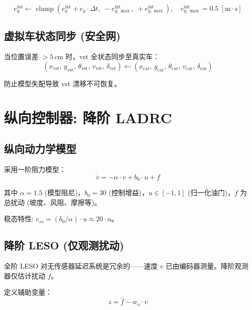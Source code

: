 \documentclass[11pt,a4paper]{article}
\begin{document}
\begin{equation}
e_y^{\text{int}} \leftarrow \operatorname{clamp}\!\left(e_y^{\text{int}} + e_y \cdot \Delta t,\; -e_{y,\max}^{\text{int}},\; +e_{y,\max}^{\text{int}}\right), \quad e_{y,\max}^{\text{int}} = 0.5 \; [\text{m}\!\cdot\!\text{s}]
\end{equation}

\subsection{虚拟车状态同步 (安全网)}

当位置误差 $>5\,\text{cm}$ 时，vst 全状态同步至真实车：
\begin{equation}
(x_{\text{vst}},\, y_{\text{vst}},\, \theta_{\text{vst}},\, v_{\text{vst}},\, \delta_{\text{vst}}) \leftarrow (x_{\text{car}},\, y_{\text{car}},\, \theta_{\text{car}},\, v_{\text{car}},\, \delta_{\text{car}})
\end{equation}

防止模型失配导致 vst 漂移不可恢复。

\section{纵向控制器: 降阶 LADRC}

\subsection{纵向动力学模型}

采用一阶阻力模型：
\begin{equation}
\dot{v} = -\alpha \cdot v + b_0 \cdot u + f
\label{eq:long_model}
\end{equation}

其中 $\alpha = 1.5$ (模型阻尼)，$b_0 = 30$ (控制增益)，$u \in [-1, 1]$ (归一化油门)，$f$ 为总扰动 (坡度、风阻、摩擦等)。

稳态特性: $v_{ss} = (b_0/\alpha) \cdot u \approx 20 \cdot u$。

\subsection{降阶 LESO (仅观测扰动)}

全阶 LESO 对无传感器延迟系统是冗余的——速度 $v$ 已由编码器测量。降阶观测器仅估计扰动 $f$。

定义辅助变量：
\begin{equation}
z = \hat{f} - w_o \cdot v
\label{eq:z_def}
\end{equation}
\end{document}
